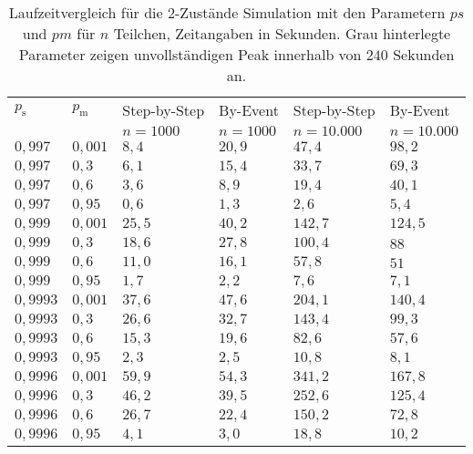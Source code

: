 \begin{table}[h]
\centering
\caption[Laufzeitvergleich für die 2-Zustände Simulation]{Laufzeitvergleich für die 2-Zustände Simulation mit den Parametern $ps$ und $pm$ für $n$ Teilchen, Zeitangaben in Sekunden. Grau hinterlegte Parameter zeigen unvollständigen Peak innerhalb von $240$ Sekunden an.}
\label{2s_laufzeit}
\begin{tabular}{|l|l||l|l|l|l|} \hline
$p_\text{s}$ & $p_\text{m}$  & Step-by-Step & By-Event & Step-by-Step & By-Event \\ 
 &   & $n=1000$ &$n=1000$ &$n=10.000$ &$n=10.000$  \\ \hline \hline
$0,997  $ & $ 0,001 $ & $ 8,4  $ & $ 20,9  $ & $ 47,4  $ & $98,2  $\\ \hline
$0,997  $ & $ 0,3  $ & $ 6,1  $ & $ 15,4  $ & $ 33,7  $ & $69,3  $\\ \hline
$0,997  $ & $ 0,6  $ & $ 3,6  $ & $ 8,9   $  & $ 19,4 $ & $40,1  $\\ \hline
$0,997  $ & $ 0,95 $ & $ 0,6  $ & $ 1,3   $  & $ 2,6  $ & $5,4   $\\ \hline
$0,999  $ & $ 0,001 $ & $ 25,5 $ & $ 40,2  $ & $ 142,7 $ & $124,5 $\\ \hline
$0,999  $ & $ 0,3  $ & $ 18,6 $ & $ 27,8  $ & $ 100,4 $ & $88    $\\ \hline
$0,999  $ & $ 0,6  $ & $ 11,0 $ & $ 16,1  $ & $ 57,8  $ & $51    $\\ \hline
$0,999  $ & $ 0,95 $ & $ 1,7  $ & $ 2,2   $ & $ 7,6   $ & $7,1   $\\ \hline
$0,9993 $ & $ 0,001 $ & $ 37,6 $ & $ 47,6  $ & $ 204,1 $ & $140,4 $\\ \hline
$0,9993 $ & $ 0,3  $ & $ 26,6 $ & $ 32,7  $ & $ 143,4 $ & $99,3  $\\ \hline
$0,9993 $ & $ 0,6  $ & $ 15,3 $ & $ 19,6  $ & $ 82,6  $ & $57,6  $\\ \hline
$0,9993 $ & $ 0,95 $ & $ 2,3  $ & $ 2,5   $ & $ 10,8  $ & $8,1   $\\ \hline
\cellcolor{gray!25}$0,9996 $ &\cellcolor{gray!25} $ 0,001 $ & $ 59,9$ & $ 54,3 $ & $341,2 $ & $167,8$\\ \hline
$0,9996 $ & $ 0,3  $ & $ 46,2 $ & $ 39,5  $ & $ 252,6 $ & $125,4 $\\ \hline
$0,9996 $ & $ 0,6  $ & $ 26,7 $ & $ 22,4  $ & $ 150,2 $ & $72,8  $\\ \hline
$0,9996 $ & $ 0,95 $ & $ 4,1  $ & $ 3,0   $ & $ 18,8  $ & $10,2  $\\ \hline
\end{tabular}
\end{table}

